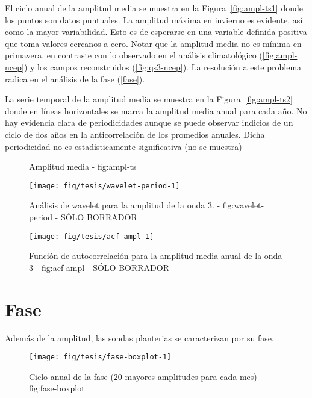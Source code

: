 \documentclass[spanish,a4paper]{book}
\begin{document}
El ciclo anual de la amplitud media se muestra en la
Figura~\ref{fig:ampl-ts1} donde los puntos son datos puntuales. La
amplitud máxima en invierno es evidente, así como la mayor variabilidad.
Esto es de esperarse en una variable definida positiva que toma valores
cercanos a cero. Notar que la amplitud media no es mínima en primavera,
en contraste con lo observado en el análisis climatológico
(\autoref{fig:ampl-ncep}) y los campos reconstruidos
(\autoref{fig:qs3-ncep}). La resolución a este problema radica en el
análisis de la fase (\autoref{fase}).

La serie temporal de la amplitud media se muestra en la
Figura~\ref{fig:ampl-ts2} donde en líneas horizontales se marca la
amplitud media anual para cada año. No hay evidencia clara de
periodicidades aunque se puede observar indicios de un ciclo de dos años
en la anticorrelación de los promedios anuales. Dicha periodicidad no es
estadísticamente significativa (no se muestra)

\begin{figure*}
\newline{}\caption{Amplitud media - fig:ampl-ts}\label{fig:ampl-ts}
\end{figure*}

\begin{figure}
\texttt{[image: fig/tesis/wavelet-period-1]} \caption{Análisis de wavelet para la amplitud de la onda 3. - fig:wavelet-period - SÓLO BORRADOR}\label{fig:wavelet-period}
\end{figure}

\begin{figure}
\texttt{[image: fig/tesis/acf-ampl-1]} \caption{Función de autocorrelación para la amplitud media anual de la onda 3 - fig:acf-ampl - SÓLO BORRADOR}\label{fig:acf-ampl}
\end{figure}

\section{Fase}\label{fase}

Además de la amplitud, las sondas planterias se caracterizan por su
fase. 

\begin{figure}

{\centering \texttt{[image: fig/tesis/fase-boxplot-1]} 

}

\caption{Ciclo anual de la fase (20 mayores amplitudes para cada mes) - fig:fase-boxplot}\label{fig:fase-boxplot}
\end{figure}
\end{document}

